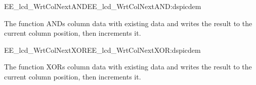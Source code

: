 \begin{function_nopb2}{EE\_lcd\_WrtColNextAND}{EE_lcd_WrtColNextAND:dspicdem}
  
  \begin{fundescription}
    The function ANDs column data with existing data and writes the
    result to the current column position, then increments it.
  \end{fundescription}
  
  \begin{funparameters}
  \end{funparameters}
  
  
\end{function_nopb2}


\begin{function_nopb2}{EE\_lcd\_WrtColNextXOR}{EE_lcd_WrtColNextXOR:dspicdem}
  
  \begin{fundescription}
    The function XORs column data with existing data and writes the
    result to the current column position, then increments it.
  \end{fundescription}
  
  \begin{funparameters}
  \end{funparameters}
  
  
\end{function_nopb2}


